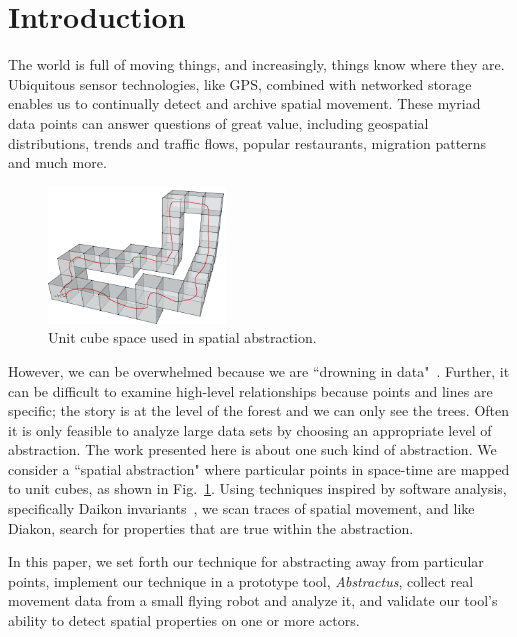 \section{Introduction}

The world is full of moving things, and increasingly, things know where they are. 
Ubiquitous sensor technologies, like GPS, combined with networked storage enables us to continually detect and archive spatial movement.
These myriad data points can answer questions of great value, including geospatial distributions, trends and traffic flows, popular restaurants, migration patterns and much more.

\begin{figure}
  \centering
  \includegraphics[width=0.42\textwidth]{./figures/path_overview}
  \caption{Unit cube space used in spatial abstraction.}
  \label{fig:unitCubes}
\end{figure}

However, we can be overwhelmed because we are ``drowning in data"~\cite{morse1993drowning}.
Further, it can be difficult to examine high-level relationships because points and lines are specific; the story is at the level of the forest and we can only see the trees.  
Often it is only feasible to analyze large data sets by choosing an appropriate level of abstraction.
The work presented here is about one such kind of abstraction.
We consider a ``spatial abstraction" where particular points in space-time are mapped to unit cubes, as shown in Fig.~\ref{fig:unitCubes}.
Using techniques inspired by software analysis, specifically Daikon invariants~\cite{kataoka2001automated}, we scan traces of spatial movement, and like Diakon, search for properties that are true within the abstraction.  

In this paper, we set forth our technique for abstracting away from particular points, 
implement our technique in a prototype tool, \emph{Abstractus},
collect real movement data from a small flying robot and analyze it, 
and validate our tool's ability to detect spatial properties on one or more actors.

